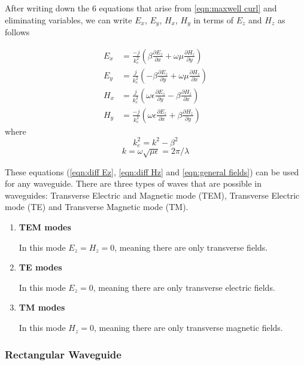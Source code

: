 After writing down the 6 equations that arise from \ref{eqn:maxwell curl} and eliminating variables, we can write $E_x$, $E_y$, $H_x$, $H_y$ in terms of $E_z$ and $H_z$ as follows

\begin{subequations}
\label{eqn:general fields}
\begin{align}
E_x& =\frac{-j}{k_c^2}\left(\beta\frac{\partial E_z}{\partial x} + \omega\mu\frac{\partial H_z}{\partial y}\right)
\label{eqn:Ex}
\\
E_y& =\frac{j}{k_c^2}\left(-\beta\frac{\partial E_z}{\partial y}+ \omega\mu\frac{\partial H_z}{\partial x}\right)
\label{eqn:Ey}
\\
H_x& =\frac{j}{k_c^2}\left(\omega\epsilon\frac{\partial E_z}{\partial y}-\beta\frac{\partial H_z}{\partial x}\right)
\label{eqn:Hx}
\\
H_y& =\frac{-j}{k_c^2}\left(\omega\epsilon\frac{\partial E_z}{\partial x}+\beta\frac{\partial H_z}{\partial y}\right)
\label{eqn:Hy}
\end{align}
\end{subequations}
where
\begin{equation}
k_c^2=k^2-\beta^2
\label{eqn:kc definition}
\end{equation}
\begin{equation}
k=\omega \sqrt{\mu\epsilon}=2\pi/\lambda
\label{eqn:k=2pi/lambda}
\end{equation}

These equations (\ref{eqn:diff Ez}, \ref{eqn:diff Hz} and \ref{eqn:general fields}) can be used for any waveguide. There are three types of waves that are possible in waveguides: Transverse Electric and Magnetic mode (TEM), Transverse Electric mode (TE) and Transverse Magnetic mode (TM).

\begin{enumerate}
\item \textbf{TEM modes}

In this mode $E_z=H_z=0$, meaning there are only transverse fields.
\item \textbf{TE modes}

In this mode $E_z=0$, meaning there are only transverse electric fields.
\item \textbf{TM modes}

In this mode $H_z=0$, meaning there are only transverse magnetic fields.
\end{enumerate}

\subsubsection{Rectangular Waveguide}

